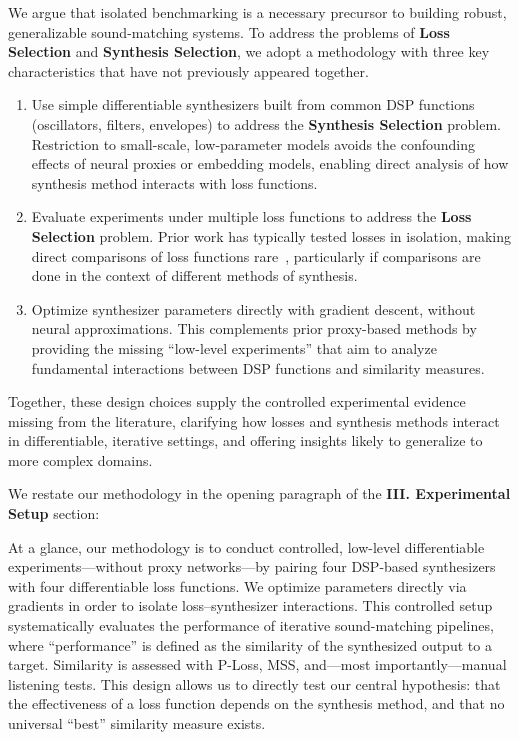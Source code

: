 \documentclass[11pt]{article}
\newcommand{\LossSelect}{\textbf{Loss Selection}}
\newcommand{\SynthSelect}{\textbf{Synthesis Selection}}
\begin{document}
\begin{displayquote}
    We argue that isolated benchmarking is a necessary precursor to building robust, generalizable sound-matching systems. To address the problems of \LossSelect{} and \SynthSelect{}, we adopt a methodology with three key characteristics that have not previously appeared together.

\begin{enumerate}
    \item Use simple differentiable synthesizers built from common DSP functions (oscillators, filters, envelopes) to address the \SynthSelect{} problem. Restriction to small-scale, low-parameter models avoids the confounding effects of neural proxies or embedding models, enabling direct analysis of how synthesis method interacts with loss functions. 
    \item Evaluate experiments under multiple loss functions to address the \LossSelect{} problem. Prior work has typically tested losses in isolation, making direct comparisons of loss functions rare~\cite{vahidi2023mesostructures,han2023perceptual,uzrad2024diffmoog}, particularly if comparisons are done in the context of different methods of synthesis. 
    \item Optimize synthesizer parameters directly with gradient descent, without neural approximations. This complements prior proxy-based methods by providing the missing “low-level experiments” that aim to analyze fundamental interactions between DSP functions and similarity measures. 
\end{enumerate}

Together, these design choices supply the controlled experimental evidence missing from the literature, 
clarifying how losses and synthesis methods interact in differentiable, iterative settings, 
and offering insights likely to generalize to more complex domains.

\end{displayquote}


\medskip
\noindent We restate our methodology in the opening paragraph of the \textbf{III. Experimental Setup} section:

\begin{displayquote}
    At a glance, our methodology is to conduct controlled, low-level differentiable experiments—without proxy networks—by pairing four DSP-based synthesizers with four differentiable loss functions. We optimize parameters directly via gradients in order to isolate loss–synthesizer interactions. This controlled setup systematically evaluates the performance of iterative sound-matching pipelines, where “performance” is defined as the similarity of the synthesized output to a target. Similarity is assessed with P-Loss, MSS, and—most importantly—manual listening tests. This design allows us to directly test our central hypothesis: that the effectiveness of a loss function depends on the synthesis method, and that no universal “best” similarity measure exists.
\end{displayquote}
\end{document}

